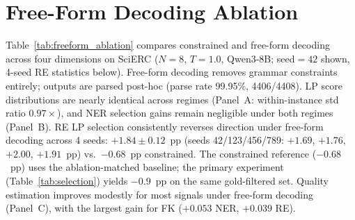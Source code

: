 \section{Free-Form Decoding Ablation}\label{app:freeform_ablation}

Table~\ref{tab:freeform_ablation} compares constrained and free-form decoding across four dimensions on SciERC ($N{=}8$, $T{=}1.0$, Qwen3-8B; seed${=}42$ shown, 4-seed RE statistics below).
Free-form decoding removes grammar constraints entirely; outputs are parsed post-hoc (parse rate 99.95\%, 4406/4408).
LP score distributions are nearly identical across regimes (Panel~A: within-instance std ratio $0.97{\times}$), and NER selection gains remain negligible under both regimes (Panel~B).
RE LP selection consistently reverses direction under free-form decoding across 4 seeds: $+1.84{\pm}0.12$~pp (seeds 42/123/456/789: $+1.69$, $+1.76$, $+2.00$, $+1.91$~pp) vs.\ $-0.68$~pp constrained.
The constrained reference ($-0.68$~pp) uses the ablation-matched baseline; the primary experiment (Table~\ref{tab:selection}) yields $-0.9$~pp on the same gold-filtered set.
Quality estimation improves modestly for most signals under free-form decoding (Panel~C), with the largest gain for FK ($+0.053$ NER, $+0.039$ RE).

